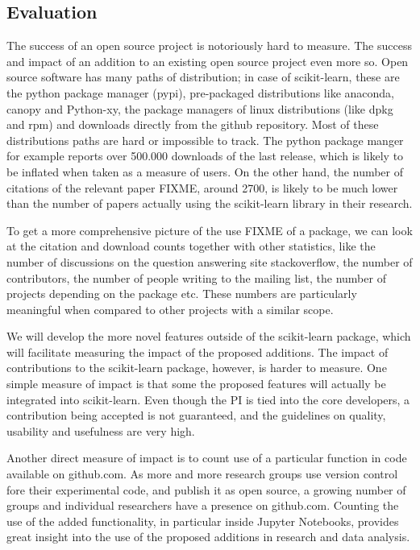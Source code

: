\subsection{Evaluation}
The success of an open source project is notoriously hard to measure. The
success and impact of an addition to an existing open source project even more
so. Open source software has many paths of distribution; in case of scikit-learn,
these are the python package manager (pypi), pre-packaged distributions like
anaconda, canopy and Python-xy, the package managers of linux distributions (like dpkg and rpm)
and downloads directly from the github repository. Most of these distributions paths are hard
or impossible to track. The python package manger for example reports over 500.000 downloads of the last
release, which is likely to be inflated when taken as a measure of users.
On the other hand, the number of citations of the relevant paper FIXME, around
2700, is likely to be much lower than the number of papers actually using the
scikit-learn library in their research.

To get a more comprehensive picture of the use FIXME of a package, we can look
at the citation and download counts together with other statistics, like the
number of discussions on the question answering site stackoverflow, the number
of contributors, the number of people writing to the mailing list, the number
of projects depending on the package etc.
These numbers are particularly meaningful when compared to other projects with
a similar scope.

We will develop the more novel features outside of the scikit-learn package, which will
facilitate measuring the impact of the proposed additions. The impact of contributions
to the scikit-learn package, however, is harder to measure. One simple measure of impact
is that some the proposed features will actually be integrated into scikit-learn.
Even though the PI is tied into the core developers, a contribution being accepted
is not guaranteed, and the guidelines on quality, usability and usefulness
are very high.

Another direct measure of impact is to count use of a particular function in
code available on github.com. As more and more research groups use version
control fore their experimental code, and publish it as open source, a growing
number of groups and individual researchers have a presence on github.com.
Counting the use of the added functionality, in particular inside Jupyter
Notebooks, provides great insight into the use of the proposed additions in
research and data analysis.


